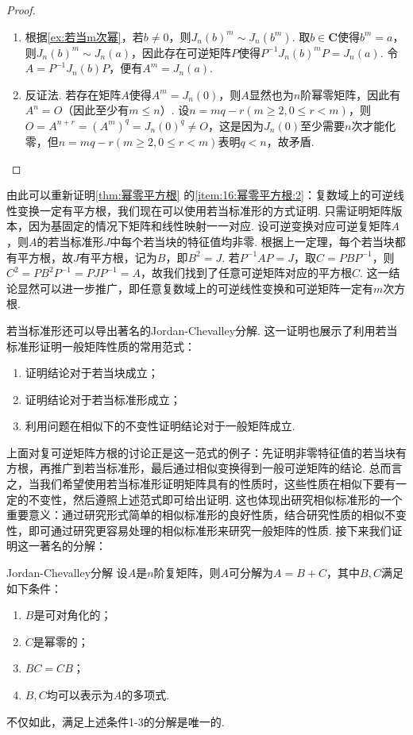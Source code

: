 \begin{proof}
    \begin{enumerate}
        \item 根据\autoref{ex:若当m次幂}，若$b\neq 0$，则$J_n(b)^m\sim J_n(b^m)$. 取$b\in\mathbf{C}$使得$b^m=a$，则$J_n(b)^m\sim J_n(a)$，因此存在可逆矩阵$P$使得$P^{-1}J_n(b)^mP=J_n(a)$. 令$A=P^{-1}J_n(b)P$，便有$A^m=J_n(a)$.

        \item 反证法. 若存在矩阵$A$使得$A^m=J_n(0)$，则$A$显然也为$n$阶幂零矩阵，因此有$A^n=O$（因此至少有$m\leqslant n$）. 设$n=mq-r(m\geqslant 2,0\leqslant r<m)$，则$O=A^{n+r}=(A^m)^q=J_n(0)^q\neq O$，这是因为$J_n(0)$至少需要$n$次才能化零，但$n=mq-r(m\geqslant 2,0\leqslant r<m)$表明$q<n$，故矛盾.
    \end{enumerate}
\end{proof}

由此可以重新证明\autoref{thm:幂零平方根} 的\ref*{item:16:幂零平方根:2}：复数域上的可逆线性变换一定有平方根，我们现在可以使用若当标准形的方式证明. 只需证明矩阵版本，因为基固定的情况下矩阵和线性映射一一对应. 设可逆变换对应可逆复矩阵$A$，则$A$的若当标准形$J$中每个若当块的特征值均非零. 根据上一定理，每个若当块都有平方根，故$J$有平方根，记为$B$，即$B^2=J$. 若$P^{-1}AP=J$，取$C=PBP^{-1}$，则$C^2=PB^2P^{-1}=PJP^{-1}=A$，故我们找到了任意可逆矩阵对应的平方根$C$. 这一结论显然可以进一步推广，即任意复数域上的可逆线性变换和可逆矩阵一定有$m$次方根.

若当标准形还可以导出著名的Jordan-Chevalley分解. 这一证明也展示了利用若当标准形证明一般矩阵性质的常用范式：
\begin{enumerate}
    \item 证明结论对于若当块成立；
    \item 证明结论对于若当标准形成立；
    \item 利用问题在相似下的不变性证明结论对于一般矩阵成立.
\end{enumerate}

上面对复可逆矩阵方根的讨论正是这一范式的例子：先证明非零特征值的若当块有方根，再推广到若当标准形，最后通过相似变换得到一般可逆矩阵的结论. 总而言之，当我们希望使用若当标准形证明矩阵具有的性质时，这些性质在相似下要有一定的不变性，然后遵照上述范式即可给出证明. 这也体现出研究相似标准形的一个重要意义：通过研究形式简单的相似标准形的良好性质，结合研究性质的相似不变性，即可通过研究更容易处理的相似标准形来研究一般矩阵的性质. 接下来我们证明这一著名的分解：

\begin{theorem}{Jordan-Chevalley分解}{}
    设$A$是$n$阶复矩阵，则$A$可分解为$A=B+C$，其中$B,C$满足如下条件：
    \begin{enumerate}
        \item $B$是可对角化的；
        \item $C$是幂零的；
        \item $BC=CB$；
        \item $B,C$均可以表示为$A$的多项式.
    \end{enumerate}
    不仅如此，满足上述条件1-3的分解是唯一的.
\end{theorem}


